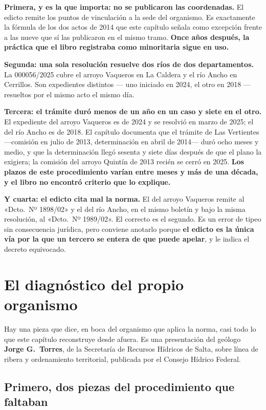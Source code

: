 \textbf{Primera, y es la que importa: no se publicaron las coordenadas.} El edicto remite los
puntos de vinculación a la sede del organismo. Es exactamente la fórmula de los dos actos de
2014 que este capítulo señala como excepción frente a las nueve que sí las publicaron en el mismo tramo.
\textbf{Once años después, la práctica que el libro registraba como minoritaria sigue en
uso.}

\textbf{Segunda: una sola resolución resuelve dos ríos de dos departamentos.} La 000056/2025
cubre el arroyo Vaqueros en La Caldera y el río Ancho en Cerrillos. Son expedientes distintos
--- uno iniciado en 2024, el otro en 2018 --- resueltos por el mismo acto el mismo día.

\textbf{Tercera: el trámite duró menos de un año en un caso y siete en el otro.} El expediente
del arroyo Vaqueros es de 2024 y se resolvió en marzo de 2025; el del río Ancho es de 2018.
El capítulo documenta que el trámite de Las Vertientes ---comisión en julio de 2013, determinación en abril de 2014--- duró ocho meses y medio, y que la determinación llegó sesenta y siete días después de que el plano la exigiera; la comisión del arroyo Quintín de 2013 recién se cerró en 2025.
\textbf{Los plazos de este procedimiento varían entre meses y más de una década, y el libro no
encontró criterio que lo explique.}

\textbf{Y cuarta: el edicto cita mal la norma.} El del arroyo Vaqueros remite al «Dcto.\ Nº
1898/02» y el del río Ancho, en el mismo boletín y bajo la misma resolución, al «Dcto.\ Nº
1989/02». El correcto es el segundo. Es un error de tipeo sin consecuencia jurídica, pero
conviene anotarlo porque \textbf{el edicto es la única vía por la que un tercero se entera de
que puede apelar}, y le indica el decreto equivocado.

\section{El diagnóstico del propio organismo}

Hay una pieza que dice, en boca del organismo que aplica la norma, casi todo lo que este
capítulo reconstruye desde afuera. Es una presentación del geólogo \textbf{Jorge G.\ Torres},
de la Secretaría de Recursos Hídricos de Salta, sobre línea de ribera y ordenamiento
territorial, publicada por el Consejo Hídrico Federal.

\subsection*{Primero, dos piezas del procedimiento que faltaban}

